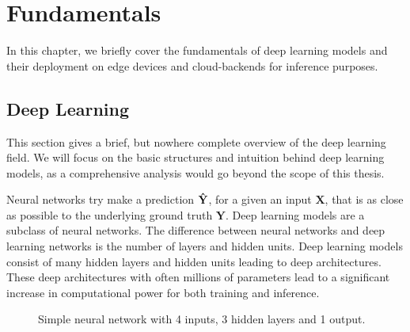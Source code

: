 \chapter{Fundamentals}
\label{chap:fundamentels}
In this chapter, we briefly cover the fundamentals of deep learning models and their deployment on edge devices and cloud-backends for inference purposes.



\section{Deep Learning}
This section gives a brief, but nowhere complete overview of the deep learning field. We will focus on the basic structures and intuition behind deep learning models, as a comprehensive analysis would go beyond the scope of this thesis.

Neural networks try make a prediction $\mathbf{\Hat{Y}}$, for a  given an input $\mathbf{X}$, that is as close as possible to the underlying ground truth $\mathbf{Y}$. 
Deep learning models are a subclass of neural networks.
The difference between neural networks and deep learning networks is the number of layers and hidden units. Deep learning models consist of many hidden layers and hidden units leading to deep architectures.
These deep architectures with often millions of parameters lead to a significant increase in computational power for both training and inference.
\begin{figure}[!htb]
    \centering
    \resizebox{.8\linewidth}{!}{}
    \caption{Simple neural network with 4 inputs, 3 hidden layers and 1 output.}
    \label{fig:simpleNN}
\end{figure}

